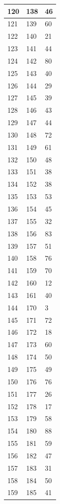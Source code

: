 \begin{tabular}{p{}p{}p{}}
\hline
120 & 138 & 46 \\
\hline
121 & 139 & 60 \\
\hline
122 & 140 & 21 \\
\hline
123 & 141 & 44 \\
\hline
124 & 142 & 80 \\
\hline
125 & 143 & 40 \\
\hline
126 & 144 & 29 \\
\hline
127 & 145 & 39 \\
\hline
128 & 146 & 43 \\
\hline
129 & 147 & 44 \\
\hline
130 & 148 & 72 \\
\hline
131 & 149 & 61 \\
\hline
132 & 150 & 48 \\
\hline
133 & 151 & 38 \\
\hline
134 & 152 & 38 \\
\hline
135 & 153 & 53 \\
\hline
136 & 154 & 45 \\
\hline
137 & 155 & 32 \\
\hline
138 & 156 & 83 \\
\hline
139 & 157 & 51 \\
\hline
140 & 158 & 76 \\
\hline
141 & 159 & 70 \\
\hline
142 & 160 & 12 \\
\hline
143 & 161 & 40 \\
\hline
144 & 170 & 3 \\
\hline
145 & 171 & 72 \\
\hline
146 & 172 & 18 \\
\hline
147 & 173 & 60 \\
\hline
148 & 174 & 50 \\
\hline
149 & 175 & 49 \\
\hline
150 & 176 & 76 \\
\hline
151 & 177 & 26 \\
\hline
152 & 178 & 17 \\
\hline
153 & 179 & 58 \\
\hline
154 & 180 & 88 \\
\hline
155 & 181 & 59 \\
\hline
156 & 182 & 47 \\
\hline
157 & 183 & 31 \\
\hline
158 & 184 & 50 \\
\hline
159 & 185 & 41 \\
\hline

\end{tabular}
